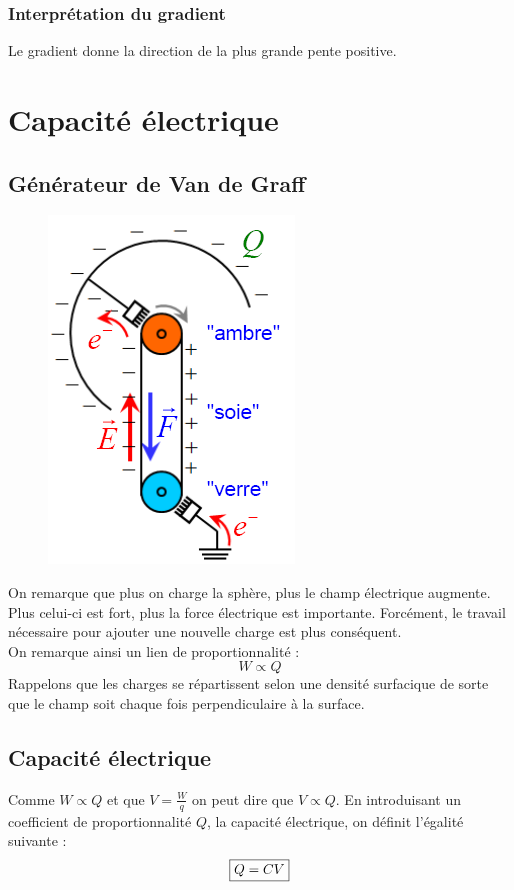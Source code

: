 \documentclass	[11pt, a4paper, openany]{book}
\begin{document}
\subsubsection{Interprétation du gradient}
Le gradient donne la direction de la plus grande pente positive.

\section{Capacité électrique}
\subsection{Générateur de Van de Graff}
\begin{figure}
\includegraphics[scale=0.34]{es/image12.png}
\end{figure}
On remarque que plus on charge la sphère, plus le champ électrique augmente. Plus celui-ci est fort, plus la force électrique est importante. Forcément, le travail nécessaire pour ajouter une nouvelle charge est plus conséquent.\\
On remarque ainsi un lien de proportionnalité :
\begin{equation}
W \propto Q
\end{equation}
Rappelons que les charges se répartissent selon une densité surfacique de sorte que le champ soit chaque fois perpendiculaire à la surface.

\subsection{Capacité électrique}
Comme $W \propto Q$ et que $V = \frac{W}{q}$ on peut dire que $V \propto Q$. En introduisant un coefficient de proportionnalité $Q$, la capacité électrique, on définit l'égalité suivante :
\begin{equation}
\fbox{$Q = CV$}
\end{equation}
\end{document}
